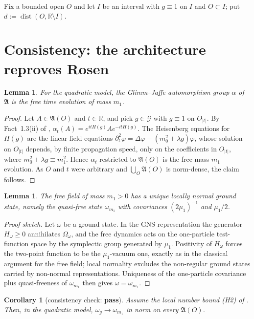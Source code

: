 \documentclass[11pt,a4paper]{article}
\theoremstyle{plain}
\newtheorem{lemma}[theorem]{Lemma}
\newtheorem{corollary}[theorem]{Corollary}
\theoremstyle{definition}
\newcommand{\A}{\mathfrak{A}}
\newcommand{\G}{\mathcal{G}}
\newcommand{\R}{\mathbb{R}}
\newcommand{\Om}{\Omega}
\DeclareMathOperator{\dist}{dist}
\begin{document}
Fix a bounded open $O$ and let $I$ be an interval with $g\equiv1$ on $I$ and $O\subset I$; put
$d:=\dist(O,\R\setminus I)$.

\section{Consistency: the architecture reproves Rosen}\label{sec:consistency}

\begin{lemma}\label{lem:freeeq}
For the quadratic model, the Glimm--Jaffe automorphism group $\alpha$ of $\A$ is the free
time evolution of mass $m_1$.
\end{lemma}

\begin{proof}
Let $A\in\A(O)$ and $t\in\R$, and pick $g\in\G$ with $g\equiv1$ on $O_{|t|}$. By
Fact~1.3(ii) of \cite{M0}, $\alpha_t(A)=e^{itH(g)}Ae^{-itH(g)}$. The Heisenberg equations for
$H(g)$ are the linear field equations $\partial_t^2\varphi=\Delta\varphi-(m_0^2+\lambda g)\varphi$,
whose solution on $O_{|t|}$ depends, by finite propagation speed, only on the coefficients in
$O_{|t|}$, where $m_0^2+\lambda g\equiv m_1^2$. Hence $\alpha_t$ restricted to $\A(O)$ is the free
mass-$m_1$ evolution. As $O$ and $t$ were arbitrary and $\bigcup_O\A(O)$ is norm-dense, the claim
follows.
\end{proof}

\begin{lemma}\label{lem:uniquegs}
The free field of mass $m_1>0$ has a unique locally normal ground state, namely the quasi-free
state $\omega_{m_1}$ with covariances $(2\mu_1)^{-1}$ and $\mu_1/2$.
\end{lemma}

\begin{proof}[Proof sketch]
Let $\omega$ be a ground state. In the GNS representation the generator $H_\omega\ge0$ annihilates
$\Om_\omega$, and the free dynamics acts on the one-particle test-function space by the symplectic
group generated by $\mu_1$. Positivity of $H_\omega$ forces the two-point function to be the
$\mu_1$-vacuum one, exactly as in the classical argument for the free field; local normality
excludes the non-regular ground states carried by non-normal representations. Uniqueness of the
one-particle covariance plus quasi-freeness of $\omega_{m_1}$ then gives $\omega=\omega_{m_1}$.
\end{proof}

\begin{corollary}[consistency check: \textbf{pass}]\label{cor:rosen}
Assume the local number bound \textup{(H2)} of \cite{M0}. Then, in the quadratic model,
$\omega_g\to\omega_{m_1}$ in norm on every $\A(O)$.
\end{corollary}
\end{document}
